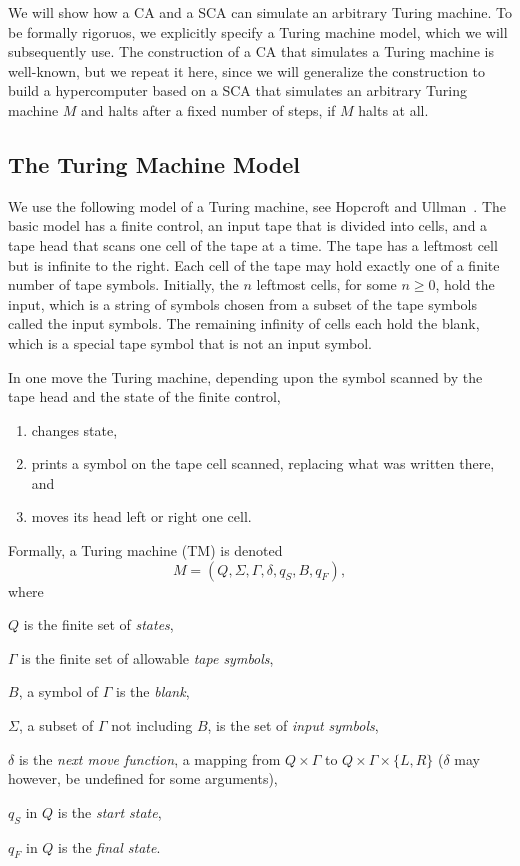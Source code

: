 \documentclass[pre,amssymb,showpacs,showkeys,preprint]{revtex4}
\begin{document}
We will show how a CA and a SCA can simulate an arbitrary Turing machine. To be formally
rigoruos, we explicitly specify a Turing machine model, which we will subsequently use.
The construction of a CA that simulates a Turing machine is well-known, but we repeat it here,
since we will generalize the construction to build a hypercomputer based on a SCA that simulates
an arbitrary Turing machine $M$ and halts after a fixed number of steps, if $M$ halts at all.

\subsection{The Turing Machine Model}

We use the following model of a Turing machine, see Hopcroft and Ullman~\cite{hopcroft}.
The basic model has a finite control, an input tape that is divided into cells, and a tape head that
scans one cell of the tape at a time.
The tape has a leftmost cell but is infinite to the right.
Each cell of the tape may hold exactly one of a finite number of tape symbols.
Initially, the $n$ leftmost cells, for some $n \geq 0$, hold the input, which is a string of symbols
chosen from a subset of the tape symbols called the input symbols.
The remaining infinity of cells each hold the blank, which is a special tape symbol that is not an
input symbol.

In one move the Turing machine, depending upon the symbol scanned by the tape head and the state
of the finite control,
\begin{enumerate}
\item changes state,
\item prints a symbol on the tape cell scanned, replacing what was written there, and
\item moves its head left or right one cell.
\end{enumerate}

Formally, a Turing machine (TM) is denoted
\[
M = (Q, \Sigma, \Gamma, \delta, q_S, B, q_F),
\]
where
\begin{list}{}{}
\item $Q$ is the finite set of \emph{states},
\item $\Gamma$ is the finite set of allowable \emph{tape symbols},
\item $B$, a symbol of $\Gamma$ is the \emph{blank},
\item $\Sigma$, a subset of $\Gamma$ not including $B$, is the set of \emph{input symbols},
\item $\delta$ is the \emph{next move function}, a mapping from $Q \times \Gamma$ to
$Q \times \Gamma \times \{L, R\}$ ($\delta$ may however, be undefined for some arguments),
\item $q_S$ in $Q$ is the \emph{start state},
\item $q_F$ in $Q$ is the \emph{final state}.
\end{list}
\end{document}
